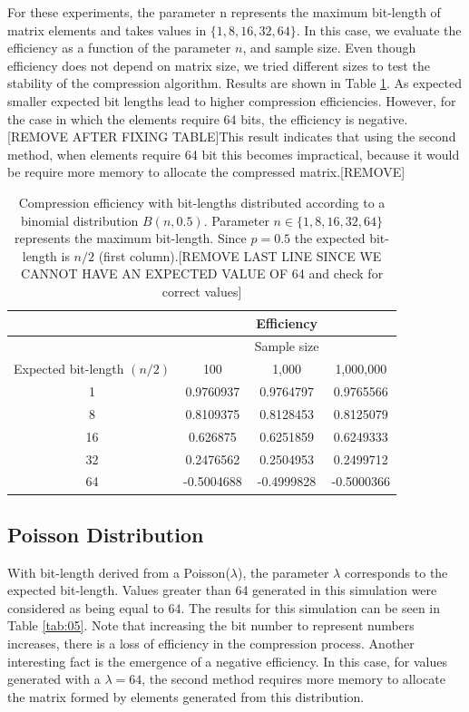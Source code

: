 \documentclass[10pt]{article}
\begin{document}
For these experiments, the parameter n represents the maximum bit-length of matrix elements and takes values in $\{1, 8, 16, 32, 64\}$. In this case, we evaluate the efficiency as a function of the parameter $n$, and sample size. Even though efficiency does not depend on matrix size, we tried different sizes to test the stability of the compression algorithm. Results are shown in Table \ref{tab:04}. As expected smaller expected bit lengths lead to higher compression efficiencies. However, for the case in which the elements require 64 bits, the efficiency is negative. [REMOVE AFTER FIXING TABLE]This result indicates that using the second method, when elements require 64 bit this becomes impractical, because it would be require more memory to allocate the compressed matrix.[REMOVE]

\begin{table}[h]
  \centering
  \caption{Compression efficiency with bit-lengths distributed according to a binomial distribution $B(n,0.5)$. Parameter $n \in \{1, 8, 16, 32, 64\}$ represents the maximum bit-length. Since $p=0.5$ the expected bit-length is $n/2$ (first column).[REMOVE LAST LINE SINCE WE CANNOT HAVE AN EXPECTED VALUE OF 64 and check for correct values]} 
 \begin{tabular}{cccc}
    \hline
			& 		&Efficiency         & \\
    \hline
			&  		&Sample size & \\
    Expected bit-length $(n/2)$		& 100		& 1,000		    & 1,000,000 \\
    \hline
     1 			&  0.9760937	& 0.9764797 	    & 0.9765566 \\
     8			&  0.8109375	& 0.8128453 	    & 0.8125079 \\
     16			&  0.626875	& 0.6251859 	    & 0.6249333 \\
     32			&  0.2476562	& 0.2504953 	    & 0.2499712 \\
     64			&  -0.5004688	& -0.4999828 	    & -0.5000366 \\
    \hline
 \end{tabular}
 \label{tab:04}
\end{table}
\subsection*{Poisson Distribution}
With bit-length derived from a Poisson($\lambda$), the parameter $\lambda$ corresponds to the expected bit-length. Values ​​greater than 64 generated in this simulation were considered as being equal to 64. The results for this simulation can be seen in Table \ref{tab:05}. Note that increasing the bit number to represent numbers increases, there is a loss of efficiency in the compression process. Another interesting fact is the emergence of a negative efficiency. In this case, for values ​​generated with a $\lambda=64$, the second method requires more memory to allocate the matrix formed by elements generated from this distribution.
\end{document}

